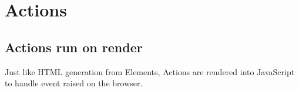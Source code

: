 \section{Actions}

\subsection*{Actions run on render}
Just like HTML generation from Elements, Actions are rendered into JavaScript to handle event raised on the browser.

